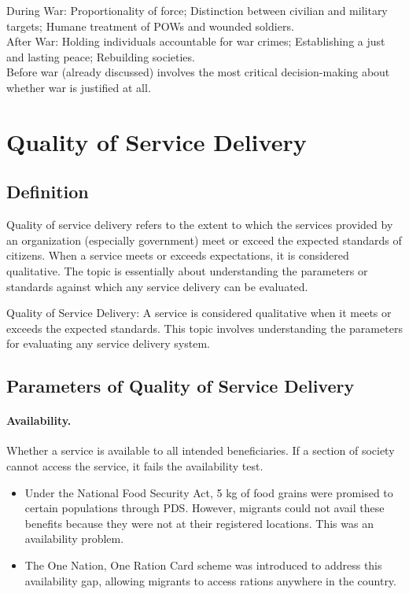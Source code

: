 \begin{QuickRevision}
During War: Proportionality of force; Distinction between civilian and military targets; Humane treatment of POWs and wounded soldiers.\\
After War: Holding individuals accountable for war crimes; Establishing a just and lasting peace; Rebuilding societies.\\
Before war (already discussed) involves the most critical decision-making about whether war is justified at all.
\end{QuickRevision}

\section{Quality of Service Delivery}

\subsection{Definition}
Quality of service delivery refers to the extent to which the services provided by an organization (especially government) meet or exceed the expected standards of citizens. When a service meets or exceeds expectations, it is considered qualitative. The topic is essentially about understanding the parameters or standards against which any service delivery can be evaluated.

\begin{KeyConcept}
Quality of Service Delivery: A service is considered qualitative when it meets or exceeds the expected standards. This topic involves understanding the parameters for evaluating any service delivery system.
\end{KeyConcept}

\subsection{Parameters of Quality of Service Delivery}

\paragraph{Availability.} Whether a service is available to all intended beneficiaries. If a section of society cannot access the service, it fails the availability test.

\begin{ExampleBox}
\begin{itemize}
\item Under the National Food Security Act, 5 kg of food grains were promised to certain populations through PDS. However, migrants could not avail these benefits because they were not at their registered locations. This was an availability problem.
\item The One Nation, One Ration Card scheme was introduced to address this availability gap, allowing migrants to access rations anywhere in the country.
\end{itemize}
\end{ExampleBox}


